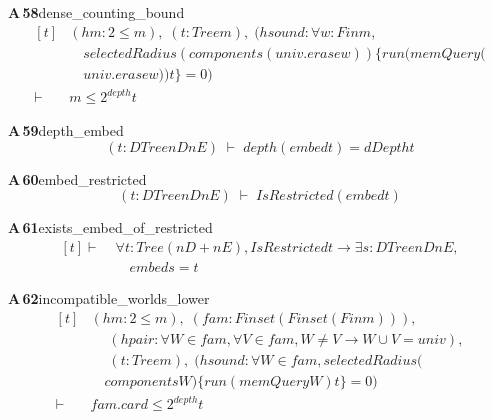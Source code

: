 \documentclass[conference]{IEEEtran}
\theoremstyle{definition}
\newcommand{\lean}[1]{\textsf{\footnotesize #1}}
\begin{document}
\noindent\textbf{A\,58}\quad\lean{dense\_counting\_bound}
{\footnotesize\[ \begin{aligned}[t]
&(\mathit{hm} : 2 \leq \mathit{m}),\; (\mathit{t} : \mathit{Tree} \mathit{m}),\; (\mathit{hsound} : \forall \mathit{w} : \mathit{Fin} \mathit{m},\\
&\quad \mathit{selectedRadius} (\mathit{components} (\mathit{univ}.\mathit{erase} \mathit{w})) \{ \mathit{run} (\mathit{memQuery} (\\
&\quad \mathit{univ}.\mathit{erase} \mathit{w})) \mathit{t}\} = 0)\\
\vdash\;&\mathit{m} \leq 2 ^{\mathit{depth}} \mathit{t}
\end{aligned} \]}

\noindent\textbf{A\,59}\quad\lean{depth\_embed}
{\footnotesize\[ (\mathit{t} : \mathit{DTree} \mathit{nD} \mathit{nE}) \;\vdash\; \mathit{depth} (\mathit{embed} \mathit{t}) = \mathit{dDepth} \mathit{t} \]}

\noindent\textbf{A\,60}\quad\lean{embed\_restricted}
{\footnotesize\[ (\mathit{t} : \mathit{DTree} \mathit{nD} \mathit{nE}) \;\vdash\; \mathit{IsRestricted} (\mathit{embed} \mathit{t}) \]}

\noindent\textbf{A\,61}\quad\lean{exists\_embed\_of\_restricted}
{\footnotesize\[ \begin{aligned}[t]
\vdash\;&\forall \mathit{t} : \mathit{Tree} (\mathit{nD} + \mathit{nE}), \mathit{IsRestricted} \mathit{t} \to \exists \mathit{s} : \mathit{DTree} \mathit{nD} \mathit{nE},\\
&\quad \mathit{embed} \mathit{s} = \mathit{t}
\end{aligned} \]}

\noindent\textbf{A\,62}\quad\lean{incompatible\_worlds\_lower}
{\footnotesize\[ \begin{aligned}[t]
&(\mathit{hm} : 2 \leq \mathit{m}),\; (\mathit{fam} : \mathit{Finset} (\mathit{Finset} (\mathit{Fin} \mathit{m}))),\\
&\quad \; (\mathit{hpair} : \forall \mathit{W} \in \mathit{fam}, \forall \mathit{V} \in \mathit{fam}, \mathit{W} \neq \mathit{V} \to \mathit{W} \cup \mathit{V} = \mathit{univ}),\\
&\quad \; (\mathit{t} : \mathit{Tree} \mathit{m}),\; (\mathit{hsound} : \forall \mathit{W} \in \mathit{fam}, \mathit{selectedRadius} (\\
&\quad \mathit{components} \mathit{W}) \{ \mathit{run} (\mathit{memQuery} \mathit{W}) \mathit{t}\} = 0)\\
\vdash\;&\mathit{fam}.\mathit{card} \leq 2 ^{\mathit{depth}} \mathit{t}
\end{aligned} \]}
\end{document}
